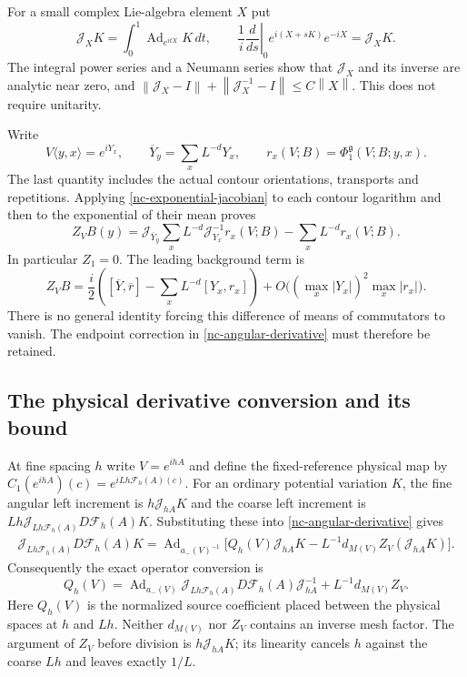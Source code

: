 \documentclass[11pt]{article}
\theoremstyle{remark}
\newcommand{\norm}[1]{\left\|#1\right\|}
\begin{document}
For a small complex Lie-algebra element $X$ put
\begin{equation}
 \mathcal J_XK=\int_0^1\operatorname{Ad}_{e^{itX}}K\,dt,
 \qquad
 \frac1i\left.\frac d{ds}\right|_0e^{i(X+sK)}e^{-iX}
           =\mathcal J_XK.
 \label{nc-exponential-jacobian}
\end{equation}
The integral power series and a Neumann series show that
$\mathcal J_X$ and its inverse are analytic near zero, and
$\norm{\mathcal J_X-I}+\norm{\mathcal J_X^{-1}-I}\le C\norm{X}$.
This does not require unitarity.

Write
\[
 V\langle y,x\rangle=e^{iY_x},\qquad
 \overline Y_y=\sum_xL^{-d}Y_x,\qquad
 r_x(V;B)=\Phi_1^{\mathfrak g}(V;B;y,x).
\]
The last quantity includes the actual contour orientations,
transports and repetitions. Applying
\eqref{nc-exponential-jacobian} to each contour logarithm and then
to the exponential of their mean proves
\begin{equation}
 Z_VB(y)=\mathcal J_{\overline Y_y}
       \sum_xL^{-d}\mathcal J_{Y_x}^{-1}r_x(V;B)
          -\sum_xL^{-d}r_x(V;B).
 \label{nc-Z-formula}
\end{equation}
In particular $Z_1=0$. The leading background term is
\[
 Z_VB=\frac i2\left(
   [\overline Y,\overline r]-\sum_xL^{-d}[Y_x,r_x]\right)
   +O\bigl((\max_x|Y_x|)^2\max_x|r_x|\bigr).
\]
There is no general identity forcing this difference of means of
commutators to vanish. The endpoint correction in
\eqref{nc-angular-derivative} must therefore be retained.

\subsection{The physical derivative conversion and its bound}
\label{nc-physical}

At fine spacing $h$ write $V=e^{ihA}$ and define the fixed-reference
physical map by
$C_1(e^{ihA})(c)=e^{iLh\mathcal F_h(A)(c)}$. For an ordinary
potential variation $K$, the fine angular left increment is
$h\mathcal J_{hA}K$ and the coarse left increment is
$Lh\mathcal J_{Lh\mathcal F_h(A)}D\mathcal F_h(A)K$.
Substituting these into \eqref{nc-angular-derivative} gives
\begin{equation}
 \begin{split}
 \mathcal J_{Lh\mathcal F_h(A)}D\mathcal F_h(A)K
 =\operatorname{Ad}_{a_-(V)^{-1}}\bigl[
 Q_h(V)\mathcal J_{hA}K
  -L^{-1}d_{M(V)}Z_V(\mathcal J_{hA}K)\bigr].
 \end{split}
 \label{nc-physical-unrearranged}
\end{equation}
Consequently the exact operator conversion is
\begin{equation}
 \boxed{\displaystyle
 Q_h(V)=\operatorname{Ad}_{a_-(V)}
   \mathcal J_{Lh\mathcal F_h(A)}D\mathcal F_h(A)
        \mathcal J_{hA}^{-1}+L^{-1}d_{M(V)}Z_V.}
 \label{nc-physical-conversion}
\end{equation}
Here $Q_h(V)$ is the normalized source coefficient placed between
the physical spaces at $h$ and $Lh$. Neither $d_{M(V)}$ nor $Z_V$
contains an inverse mesh factor. The argument of $Z_V$ before
division is $h\mathcal J_{hA}K$; its linearity cancels $h$ against
the coarse $Lh$ and leaves exactly $1/L$.
\end{document}
